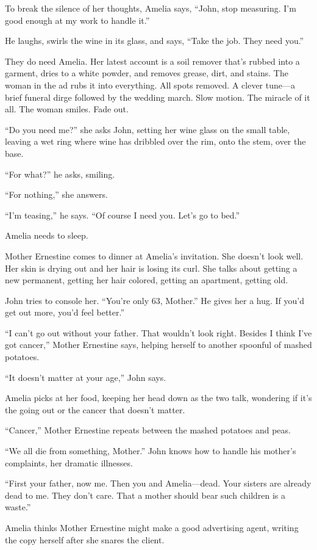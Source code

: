 \documentclass[twoside,10pt]{book}
\begin{document}
To break the silence of her thoughts, Amelia says, ``John, stop
measuring. I'm good enough at my work to handle it.''

He laughs, swirls the wine in its glass, and says, ``Take the job. They
need you.''

They do need Amelia. Her latest account is a soil remover that's rubbed
into a garment, dries to a white powder, and removes grease, dirt, and
stains. The woman in the ad rubs it into everything. All spots removed.
A clever tune---a brief funeral dirge followed by the wedding march.
Slow motion. The miracle of it all. The woman smiles. Fade out.

``Do you need me?'' she asks John, setting her wine glass on the small
table, leaving a wet ring where wine has dribbled over the rim, onto the
stem, over the base.

``For what?'' he asks, smiling.

``For nothing,'' she answers.

``I'm teasing,'' he says. ``Of course I need you. Let's go to bed.''

Amelia needs to sleep.

Mother Ernestine comes to dinner at Amelia's invitation. She doesn't
look well. Her skin is drying out and her hair is losing its curl. She
talks about getting a new permanent, getting her hair colored, getting
an apartment, getting old.

John tries to console her. ``You're only 63, Mother.'' He gives her a
hug. If you'd get out more, you'd feel better.''

``I can't go out without your father. That wouldn't look right. Besides
I think I've got cancer,'' Mother Ernestine says, helping herself to
another spoonful of mashed potatoes.

``It doesn't matter at your age,'' John says.

Amelia picks at her food, keeping her head down as the two talk,
wondering if it's the going out or the cancer that doesn't matter.

``Cancer,'' Mother Ernestine repeats between the mashed potatoes and
peas.

``We all die from something, Mother.'' John knows how to handle his
mother's complaints, her dramatic illnesses.

``First your father, now me. Then you and Amelia---dead. Your sisters
are already dead to me. They don't care. That a mother should bear such
children is a waste.''

Amelia thinks Mother Ernestine might make a good advertising agent,
writing the copy herself after she snares the client.
\end{document}
